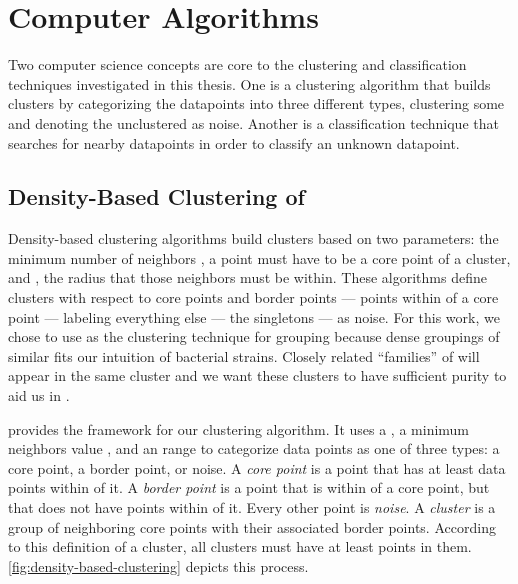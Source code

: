 \section{Computer Algorithms}
Two computer science concepts are core to the clustering and classification techniques investigated in this thesis.
One is a clustering algorithm that builds clusters by categorizing the datapoints into three different types, clustering some and denoting the unclustered as noise.
Another is a classification technique that searches for nearby datapoints in order to classify an unknown datapoint.


\subsection{Density-Based Clustering of \Isols{}}\label{sec:dbscan}
Density-based clustering algorithms build clusters based on two parameters: the minimum number of neighbors \minneigh{},  a point must have to be a core point of a cluster, and \eps{}, the radius that those neighbors must be within. 
These algorithms define clusters with respect to core points and border points --- points within \eps{} of a core point --- labeling everything else --- the singletons --- as noise.
For this work, we chose to use \dbscan{} as the clustering technique for grouping \isols{} because dense groupings of similar \isols{} fits our intuition of bacterial \isol{} strains.
Closely related ``families'' of \isols{} will appear in the same cluster and we want these clusters to have sufficient purity to aid us in \mst{}.


\dbscan{}\cite{ester1996density} provides the framework for our clustering algorithm. 
It uses a \distmetric{}, a minimum neighbors value \minneigh{}, and an \eps{} range to categorize data points as one of three types:
\index{\dbscan{}}
\index{\distmetric{}}
\index{\minneigh{}}
\index{\eps{}}
a core point, a border point, or noise.
A \textit{core point} is a point that has at least \minneigh{} data points within \eps{} of it. 
A \textit{border point} is a point that is within \eps{} of a core point, but that does not have \minneigh{} points within \eps{} of it.
Every other point is \textit{noise}. 
A \textit{cluster} is a group of neighboring core points with their associated border points.
According to this definition of a cluster, all clusters must have at least \minneigh{} points in them.
\autoref{fig:density-based-clustering} depicts this process.


